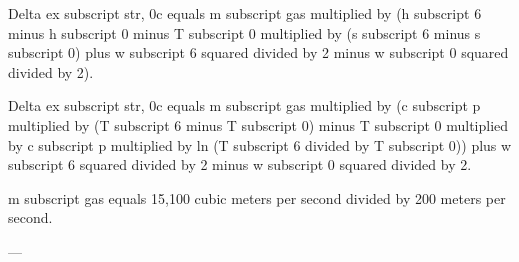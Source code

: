 Delta ex subscript str, 0c equals m subscript gas multiplied by (h subscript 6 minus h subscript 0 minus T subscript 0 multiplied by (s subscript 6 minus s subscript 0) plus w subscript 6 squared divided by 2 minus w subscript 0 squared divided by 2).  

Delta ex subscript str, 0c equals m subscript gas multiplied by (c subscript p multiplied by (T subscript 6 minus T subscript 0) minus T subscript 0 multiplied by c subscript p multiplied by ln (T subscript 6 divided by T subscript 0)) plus w subscript 6 squared divided by 2 minus w subscript 0 squared divided by 2.  

m subscript gas equals 15,100 cubic meters per second divided by 200 meters per second.  

---